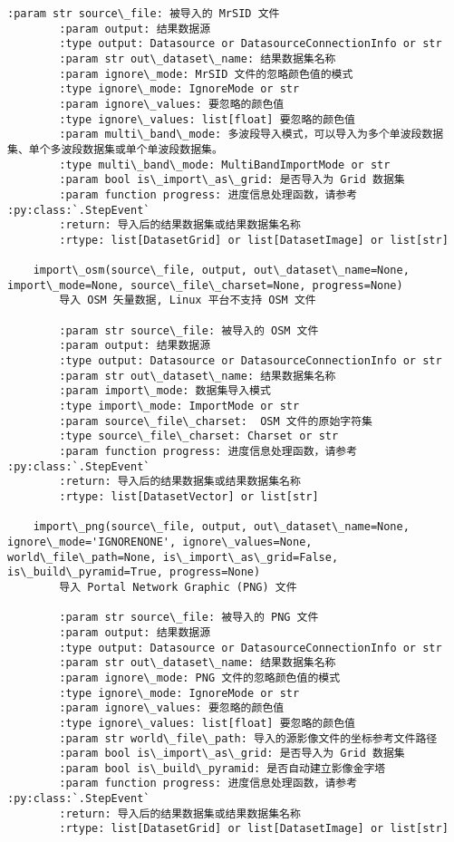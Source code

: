 \documentclass[11pt]{article}
\begin{document}
\begin{Verbatim}[commandchars=\\\{\}]
        :param str source\_file: 被导入的 MrSID 文件
        :param output: 结果数据源
        :type output: Datasource or DatasourceConnectionInfo or str
        :param str out\_dataset\_name: 结果数据集名称
        :param ignore\_mode: MrSID 文件的忽略颜色值的模式
        :type ignore\_mode: IgnoreMode or str
        :param ignore\_values: 要忽略的颜色值
        :type ignore\_values: list[float] 要忽略的颜色值
        :param multi\_band\_mode: 多波段导入模式，可以导入为多个单波段数据集、单个多波段数据集或单个单波段数据集。
        :type multi\_band\_mode: MultiBandImportMode or str
        :param bool is\_import\_as\_grid: 是否导入为 Grid 数据集
        :param function progress: 进度信息处理函数，请参考 :py:class:`.StepEvent`
        :return: 导入后的结果数据集或结果数据集名称
        :rtype: list[DatasetGrid] or list[DatasetImage] or list[str]
    
    import\_osm(source\_file, output, out\_dataset\_name=None, import\_mode=None, source\_file\_charset=None, progress=None)
        导入 OSM 矢量数据, Linux 平台不支持 OSM 文件
        
        :param str source\_file: 被导入的 OSM 文件
        :param output: 结果数据源
        :type output: Datasource or DatasourceConnectionInfo or str
        :param str out\_dataset\_name: 结果数据集名称
        :param import\_mode: 数据集导入模式
        :type import\_mode: ImportMode or str
        :param source\_file\_charset:  OSM 文件的原始字符集
        :type source\_file\_charset: Charset or str
        :param function progress: 进度信息处理函数，请参考 :py:class:`.StepEvent`
        :return: 导入后的结果数据集或结果数据集名称
        :rtype: list[DatasetVector] or list[str]
    
    import\_png(source\_file, output, out\_dataset\_name=None, ignore\_mode='IGNORENONE', ignore\_values=None, world\_file\_path=None, is\_import\_as\_grid=False, is\_build\_pyramid=True, progress=None)
        导入 Portal Network Graphic (PNG) 文件
        
        :param str source\_file: 被导入的 PNG 文件
        :param output: 结果数据源
        :type output: Datasource or DatasourceConnectionInfo or str
        :param str out\_dataset\_name: 结果数据集名称
        :param ignore\_mode: PNG 文件的忽略颜色值的模式
        :type ignore\_mode: IgnoreMode or str
        :param ignore\_values: 要忽略的颜色值
        :type ignore\_values: list[float] 要忽略的颜色值
        :param str world\_file\_path: 导入的源影像文件的坐标参考文件路径
        :param bool is\_import\_as\_grid: 是否导入为 Grid 数据集
        :param bool is\_build\_pyramid: 是否自动建立影像金字塔
        :param function progress: 进度信息处理函数，请参考 :py:class:`.StepEvent`
        :return: 导入后的结果数据集或结果数据集名称
        :rtype: list[DatasetGrid] or list[DatasetImage] or list[str]
    

\end{Verbatim}
\end{document}
